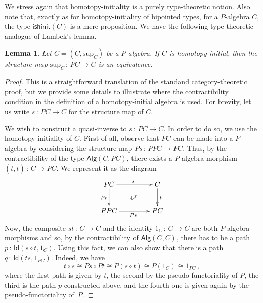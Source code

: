 \documentclass[10pt,a4paper,oneside,reqno]{amsart}
\numberwithin{equation}{section}
\theoremstyle{mythm}
\newtheorem{lemma}[theorem]{Lemma}
\theoremstyle{mydef}
\theoremstyle{myrmk}
\newcommand{\co}{\,{:}\,}
\newcommand{\iso}{\cong}
\newcommand{\isalghinit}{\mathsf{ishinit}}
\newcommand{\Id}{\mathsf{Id}}
\newcommand{\Palg}{\mathsf{Alg}}
\renewcommand{\sup}{\mathrm{sup}}
\begin{document}
We stress again that homotopy-initiality is a purely type-theoretic notion. Also note that, exactly as for 
homotopy-initiality of bipointed types, for a $P$-algebra $C$, the type
$\isalghinit(C)$ is a mere proposition. 
We have the following type-theoretic analogue of Lambek's lemma.


\begin{lemma}\label{lem:IntLambek} Let $C = (C, \sup_C)$ be a $P$-algebra. 
If $C$ is homotopy-initial, then the structure map $\sup_C \co PC \to C$ is an equivalence.
\end{lemma}


\begin{proof} This is a straightforward translation of the standand category-theoretic proof, but we provide
some details to illustrate where the contractibility condition in the definition of a homotopy-initial algebra is
used. For brevity, let us write $s \co PC \to C$ for the structure map of $C$. 

 We wish to construct a quasi-inverse to $s \co PC \to C$. In order to do so, we use the homotopy-initiality
of $C$. First of all, observe that $PC$ can be made into a $P$-algebra by considering the structure map 
$Ps \co PPC \to PC$. Thus, by the contractibility of the type $\Palg(C, PC)$, there exists a $P$-algebra
morphism $(t, \bar{t}) \co C \to PC$. We represent it as the diagram
\begin{equation*}
\xymatrix@C=1.5cm{
PC \ar[d]_{Pt} \ar[r]^{s} \ar@{}[dr]|{\Downarrow \bar{t}}& C \ar[d]^{t} \\
PPC \ar[r]_{Ps} & PC}
\end{equation*}
Now, the composite $s  t \co C \to C$ and the identity $1_C \co C \to C$ are both $P$-algebra
morphisms and so, by the contractibility of $\Palg(C,C)$, there has to be a path $p \co \Id(s\circ t ,1_C)$. 
Using this fact, we can also show that there is a path $q \co \Id(t  s, 1_{PC})$. Indeed, we have
\[
t \circ s  \iso Ps \circ Pt 
 \iso P(s \circ t) 
 \iso P(1_C) 
  \iso 1_{PC} \, ,
\]
where the first path is given by $\bar{t}$, the second by the pseudo-functoriality of $P$,
the third is the path $p$ constructed above, and the fourth one is given again by the pseudo-functoriality of~$P$. 
\end{proof}
\end{document}
